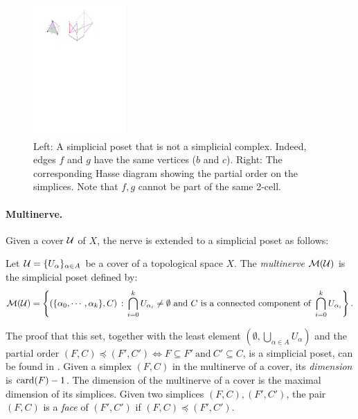 \begin{figure}[t] 
\begin{center}
\includegraphics[height = 5cm]{figures/PosetExample}\hspace{3mm}
\caption[Simplicial poset]{\label{fig:PosetExample} Left: A simplicial poset that is not a 
simplicial complex. Indeed, edges $f$ and $g$ have the same vertices ($b$ and $c$). 
Right: The corresponding Hasse diagram showing the partial order on the simplices. Note that $f,g$
cannot be part of the same 2-cell. \vspace{-4mm}}
\end{center} 
\end{figure}

\paragraph*{Multinerve.} Given a cover $\mathcal{U}$ of $X$, the nerve is extended
to a simplicial poset as follows:

\begin{defin}
Let $\mathcal{U}=\{U_\alpha\}_{\alpha\in A}$ be a cover of a topological space $X$.
The \emph{multinerve $\mathcal{M}(\mathcal{U})$}
is the simplicial poset defined by:
\[
\mathcal{M}(\mathcal{U})=\left\{\left(\{\alpha_0, \cdots, \alpha_k\} ,C\right)\,:\, \bigcap_{i=0}^k 
U_{\alpha_i}\neq\emptyset\text{ and }C\text{ is a connected component of }\bigcap_{i=0}^k U_{\alpha_i}\right\}.
\]
\end{defin}

The proof that this set, together with the least element $(\emptyset,\bigcup_{\alpha\in A} U_\alpha)$
and the partial order $(F,C)\preceq(F',C')\Leftrightarrow F\subseteq F'\ \text{and}\ C'\subseteq C$, 
is a simplicial poset, can be found in \cite{Verdiere12}.
Given a simplex $(F,C)$ in the multinerve of a cover, its \textit{dimension}
is ${\rm card}(F)-1$. 
The dimension of the multinerve of a cover is the maximal dimension of
its simplices.  Given two simplices $(F,C),(F',C')$, the pair $(F,C)$ is a
{\em face} of $(F',C')$ if $(F,C)\preceq (F',C')$.  


